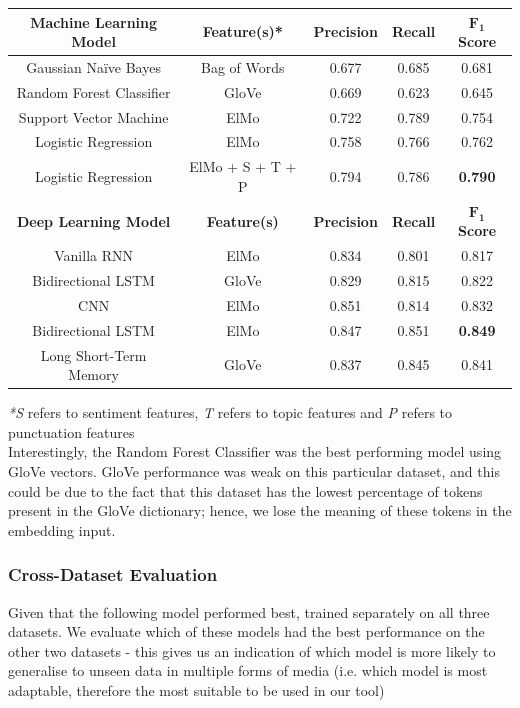 \documentclass[12pt,a4paper]{article}
\begin{document}
\begin{center}
	\begin{tabular}{ |c||c|c|c|c|}
		\hline
		\textbf{Machine Learning Model}& \textbf{Feature(s)*} & \textbf{Precision} & \textbf{Recall} & \textbf{$\mathbf{F_1}$ Score}\\
		\hline\hline
		Gaussian Na\"{i}ve Bayes & Bag of Words & 0.677 & 0.685 & 0.681\\
		Random Forest Classifier & GloVe  & 0.669   & 0.623 & 0.645\\
		Support Vector Machine & ElMo  & 0.722 & 0.789 & 0.754\\
		Logistic Regression & ElMo  & 0.758 & 0.766 & 0.762\\
		Logistic Regression & ElMo + S + T + P & 0.794 & 0.786 & \textbf{0.790}\\
		\hline\hline
		\textbf{Deep Learning Model}& \textbf{Feature(s)} & \textbf{Precision} & \textbf{Recall} & \textbf{$\mathbf{F_1}$ Score}\\
		\hline
		Vanilla RNN & ElMo  & 0.834   & 0.801 & 0.817\\
		Bidirectional LSTM & GloVe  & 0.829 & 0.815 & 0.822\\
		CNN & ElMo  & 0.851   & 0.814 & 0.832\\
		Bidirectional LSTM & ElMo  & 0.847   & 0.851 & \textbf{0.849}\\
		Long Short-Term Memory & GloVe & 0.837   & 0.845 & 0.841\\
		\hline
	\end{tabular}
\end{center}
\textit{*S} refers to sentiment features, \textit{T} refers to topic features and \textit{P} refers to punctuation features\\

Interestingly, the Random Forest Classifier was the best performing model using GloVe vectors. GloVe performance was weak on this particular dataset, and this could be due to the fact that this dataset has the lowest percentage of tokens present in the GloVe dictionary; hence, we lose the meaning of these tokens in the embedding input.



\newpage

\subsubsection{Cross-Dataset Evaluation}
Given that the following model performed best, trained separately on all three datasets. We evaluate which of these models had the best performance on the other two datasets - this gives us an indication of which model is more likely to generalise to unseen data in multiple forms of media (i.e. which model is most adaptable, therefore the most suitable to be used in our tool)
\end{document}

